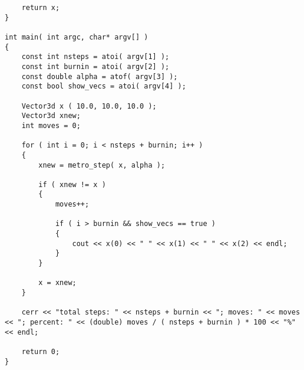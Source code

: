 \begin{lstlisting}
    return x;
}

int main( int argc, char* argv[] )
{
    const int nsteps = atoi( argv[1] );
    const int burnin = atoi( argv[2] );
    const double alpha = atof( argv[3] ); 
    const bool show_vecs = atoi( argv[4] );

    Vector3d x ( 10.0, 10.0, 10.0 );
    Vector3d xnew;
    int moves = 0;

    for ( int i = 0; i < nsteps + burnin; i++ )
    {
        xnew = metro_step( x, alpha );

        if ( xnew != x )
        {
            moves++;

            if ( i > burnin && show_vecs == true )
            {
                cout << x(0) << " " << x(1) << " " << x(2) << endl;
            }
        }

        x = xnew;
    }

    cerr << "total steps: " << nsteps + burnin << "; moves: " << moves << "; percent: " << (double) moves / ( nsteps + burnin ) * 100 << "%" << endl;

    return 0;
}
\end{lstlisting}

